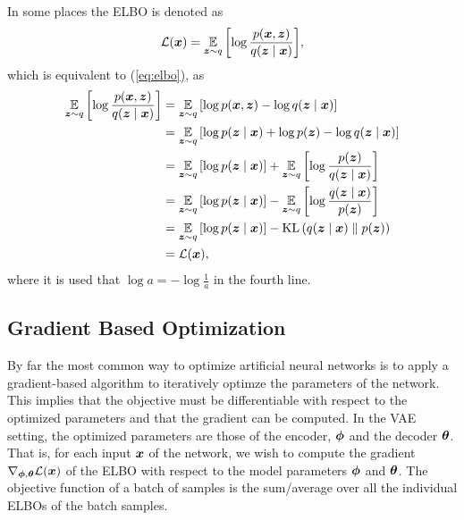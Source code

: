 In some places the ELBO is denoted as
\[ \mathcal{L}(\bm{ x }) = \operatorname*{\mathbb{E}}_{\bm{ z }\sim q}{\mathopen{} \left[ \log \frac{p(\bm{ x }, \bm{ z })}{q(\bm{ z } \mid \bm{ x })} \right] \mathclose{}},\]
which is equivalent to (\ref{eq:elbo}), as
\begin{align*}
    \operatorname*{\mathbb{E}}_{\bm{ z }\sim q}{\mathopen{} \left[ \log \frac{p(\bm{ x }, \bm{ z })}{q(\bm{ z } \mid \bm{ x })} \right] \mathclose{}} &= \operatorname*{\mathbb{E}}_{\bm{ z }\sim q}{\mathopen{} \left[ \log p(\bm{ x }, \bm{ z }) - \log q(\bm{ z } \mid \bm{ x }) \right] \mathclose{}}\\
    &= \operatorname*{\mathbb{E}}_{\bm{ z }\sim q}{\mathopen{} \left[ \log p(\bm{ z } \mid \bm{ x }) + \log p(\bm{ z }) - \log q(\bm{ z } \mid \bm{ x }) \right] \mathclose{}}\\
    &= \operatorname*{\mathbb{E}}_{\bm{ z }\sim q}{\mathopen{} \left[ \log p(\bm{ z } \mid \bm{ x }) \right] \mathclose{}} + \operatorname*{\mathbb{E}}_{\bm{ z }\sim q}{\mathopen{} \left[ \log \frac{p(\bm{ z })}{q(\bm{ z } \mid \bm{ x })} \right] \mathclose{}}\\
    &= \operatorname*{\mathbb{E}}_{\bm{ z }\sim q}{\mathopen{} \left[ \log p(\bm{ z } \mid \bm{ x }) \right] \mathclose{}} - \operatorname*{\mathbb{E}}_{\bm{ z }\sim q}{\mathopen{} \left[ \log \frac{q(\bm{ z } \mid \bm{ x })}{p(\bm{ z })} \right] \mathclose{}}\\
    &= \operatorname*{\mathbb{E}}_{\bm{ z }\sim q}{\mathopen{} \left[ \log p(\bm{ z } \mid \bm{ x }) \right] \mathclose{}} - \operatorname{KL}{\mathopen{} \left(q(\bm{ z } \mid \bm{ x }) \parallel p(\bm{ z })\right) \mathclose{}}\\
    &= \mathcal{L}(\bm{ x }),
\end{align*}
where it is used that $\log a = - \log \frac{1}{a}$ in the fourth line.


\subsection{Gradient Based Optimization}
\label{sec:gradient_based)optimization}
By far the most common way to optimize artificial neural networks is to apply a gradient-based algorithm to iteratively optimze the parameters of the network. This implies that the objective must be differentiable with respect to the optimized parameters and that the gradient can be computed. In the VAE setting, the optimized parameters are those of the encoder, $\bm{ \phi }$ and the decoder $\bm{ \theta }$. That is, for each input $\bm{ x }$ of the network, we wish to compute the gradient $\nabla_{\bm{ \phi }, \bm{ \theta }} \mathcal{L}(\bm{ x })$ of the ELBO with respect to the model parameters $\bm{ \phi }$ and $\bm{ \theta }$. The objective function of a batch of samples is the sum/average over all the individual ELBOs of the batch samples.

